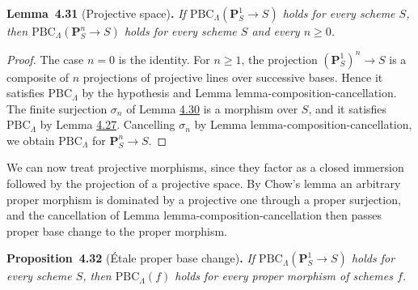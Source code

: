 \documentclass[11pt]{article}
\newenvironment{bpstatement}[2]{\par\addvspace{0.6\baselineskip}\noindent\textbf{#1}#2\textbf{.}\enspace\ignorespaces}
  {\par\addvspace{0.4\baselineskip}}
\newenvironment{bpstatementit}[2]{\begin{bpstatement}{#1}{#2}\itshape\ignorespaces}{\end{bpstatement}}
\begin{document}
\label{bp375}%
\begin{bpstatementit}{Lemma~4.31}{ (Projective space)}
If \(\mathrm{PBC}_\Lambda(\mathbf P^1_S\to S)\) holds for every scheme \(S\), then \(\mathrm{PBC}_\Lambda(\mathbf P^n_S\to S)\) holds for every scheme \(S\) and every \(n\geq0\).
\end{bpstatementit}

\begin{proof}[{Proof}]\label{bp376}%
The case \(n=0\) is the identity. For \(n\geq1\), the projection \((\mathbf P^1_S)^n\to S\) is a composite of \(n\) projections of projective lines over successive bases. Hence it satisfies \(\mathrm{PBC}_\Lambda\) by the hypothesis and Lemma lemma-composition-cancellation. The finite surjection \(\sigma_n\) of Lemma \hyperref[bp372]{4.30} is a morphism over \(S\), and it satisfies \(\mathrm{PBC}_\Lambda\) by Lemma \hyperref[bp364]{4.27}. Cancelling \(\sigma_n\) by Lemma lemma-composition-cancellation, we obtain \(\mathrm{PBC}_\Lambda\) for \(\mathbf P^n_S\to S\).
\end{proof}

\label{bp377}%
We can now treat projective morphisms, since they factor as a closed immersion followed by the projection of a projective space. By Chow's lemma an arbitrary proper morphism is dominated by a projective one through a proper surjection, and the cancellation of Lemma lemma-composition-cancellation then passes proper base change to the proper morphism.

\label{bp378}%
\begin{bpstatementit}{Proposition~4.32}{ (Étale proper base change)}
If \(\mathrm{PBC}_\Lambda(\mathbf P^1_S\to S)\) holds for every scheme \(S\), then \(\mathrm{PBC}_\Lambda(f)\) holds for every proper morphism of schemes \(f\).
\end{bpstatementit}
\end{document}
